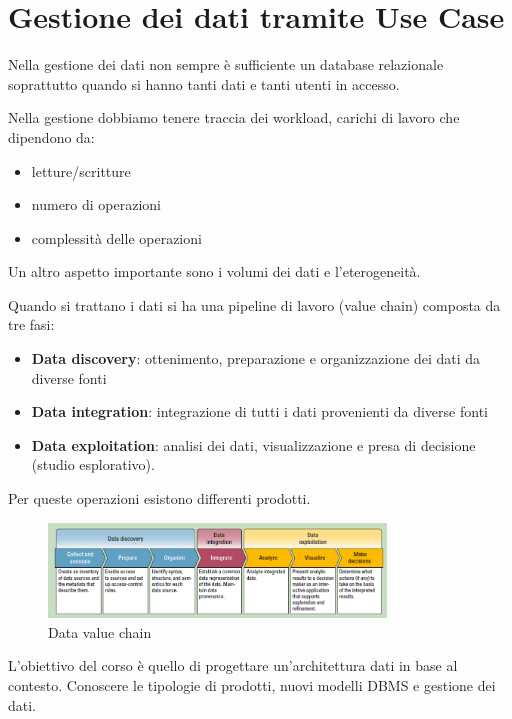 \section{Gestione dei dati tramite Use Case}
Nella gestione dei dati non sempre è sufficiente un database relazionale soprattutto
quando si hanno tanti dati e tanti utenti in accesso.

Nella gestione dobbiamo tenere traccia dei workload, carichi di lavoro che dipendono da:
\begin{itemize}
    \item letture/scritture
    \item numero di operazioni
    \item complessità delle operazioni
\end{itemize}
Un altro aspetto importante sono i volumi dei dati e l'eterogeneità.

Quando si trattano i dati si ha una pipeline di lavoro (value chain) composta da
tre fasi:
\begin{itemize}
    \item \textbf{Data discovery}: ottenimento, preparazione e organizzazione
          dei dati da diverse fonti
    \item \textbf{Data integration}: integrazione di tutti i dati provenienti da
          diverse fonti
    \item \textbf{Data exploitation}: analisi dei dati, visualizzazione e presa
          di decisione (studio esplorativo).
\end{itemize}
Per queste operazioni esistono differenti prodotti.
\begin{figure}[ht]
    \centering
    \includegraphics[width=0.8\textwidth]{./img/data_chain.png}
    \caption{Data value chain}
    \label{fig:valChain}
\end{figure}

L'obiettivo del corso è quello di progettare un'architettura dati in base al
contesto. Conoscere le tipologie di prodotti, nuovi modelli DBMS e gestione dei
dati.

